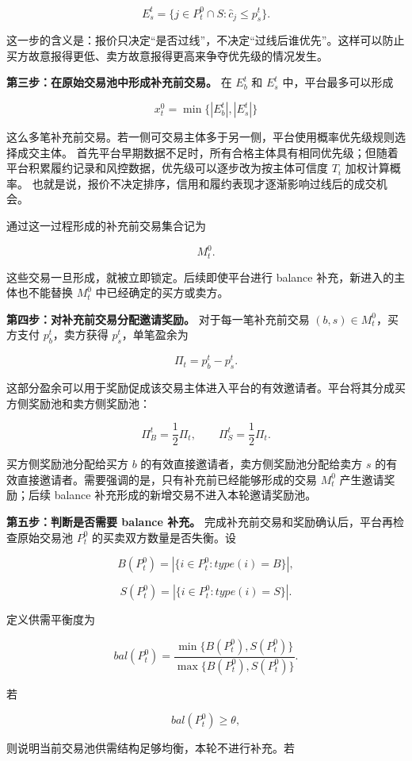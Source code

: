 \documentclass[UTF8,11pt]{ctexart}
\begin{document}
\[
    E_s^t=\{j\in P_t^0\cap S:\hat c_j\le p_s^t\}.
\]

这一步的含义是：报价只决定“是否过线”，不决定“过线后谁优先”。这样可以防止买方故意报得更低、卖方故意报得更高来争夺优先级的情况发生。

\textbf{第三步：在原始交易池中形成补充前交易。}
在 \(E_b^t\) 和 \(E_s^t\) 中，平台最多可以形成

\[
    x_t^0=\min\{|E_b^t|,|E_s^t|\}
\]

这么多笔补充前交易。若一侧可交易主体多于另一侧，平台使用概率优先级规则选择成交主体。
首先平台早期数据不足时，所有合格主体具有相同优先级；但随着平台积累履约记录和风控数据，优先级可以逐步改为按主体可信度 \(T_i\) 加权计算概率。
也就是说，报价不决定排序，信用和履约表现才逐渐影响过线后的成交机会。

通过这一过程形成的补充前交易集合记为

\[
    M_t^0.
\]

这些交易一旦形成，就被立即锁定。后续即使平台进行 balance 补充，新进入的主体也不能替换 \(M_t^0\) 中已经确定的买方或卖方。

\textbf{第四步：对补充前交易分配邀请奖励。}
对于每一笔补充前交易 \((b,s)\in M_t^0\)，买方支付 \(p_b^t\)，卖方获得 \(p_s^t\)，单笔盈余为

\[
    \Pi_t=p_b^t-p_s^t.
\]

这部分盈余可以用于奖励促成该交易主体进入平台的有效邀请者。平台将其分成买方侧奖励池和卖方侧奖励池：

\[
    \Pi_B^t=\frac{1}{2}\Pi_t,\qquad
    \Pi_S^t=\frac{1}{2}\Pi_t.
\]

买方侧奖励池分配给买方 \(b\) 的有效直接邀请者，卖方侧奖励池分配给卖方 \(s\) 的有效直接邀请者。需要强调的是，只有补充前已经能够形成的交易 \(M_t^0\) 产生邀请奖励；后续 balance 补充形成的新增交易不进入本轮邀请奖励池。

\textbf{第五步：判断是否需要 balance 补充。}
完成补充前交易和奖励确认后，平台再检查原始交易池 \(P_t^0\) 的买卖双方数量是否失衡。设

\[
    B(P_t^0)=|\{i\in P_t^0:type(i)=B\}|,
\]

\[
    S(P_t^0)=|\{i\in P_t^0:type(i)=S\}|.
\]

定义供需平衡度为

\[
    bal(P_t^0)=
    \frac{\min\{B(P_t^0),S(P_t^0)\}}
    {\max\{B(P_t^0),S(P_t^0)\}}.
\]

若

\[
    bal(P_t^0)\ge \theta,
\]

则说明当前交易池供需结构足够均衡，本轮不进行补充。若
\end{document}
